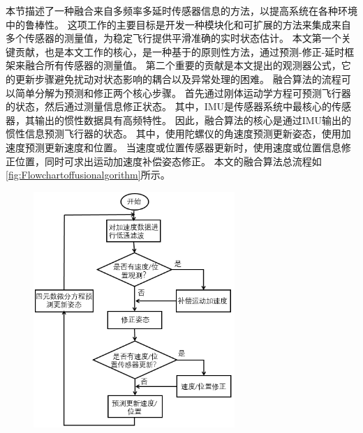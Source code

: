 \documentclass[
  type=master
]{gdutthesis}
\begin{document}
本节描述了一种融合来自多频率多延时传感器信息的方法，以提高系统在各种环境中的鲁棒性。
这项工作的主要目标是开发一种模块化和可扩展的方法来集成来自多个传感器的测量值，为稳定飞行提供平滑准确的实时状态估计。
本文第一个关键贡献，也是本文工作的核心，是一种基于\parencite{mahony2008nonlinear}的原则性方法，通过预测-修正-延时框架来融合所有传感器的测量值。
第二个重要的贡献是本文提出的观测器公式，它的更新步骤避免扰动对状态影响的耦合以及异常处理的困难。
融合算法的流程可以简单分解为预测和修正两个核心步骤。
首先通过刚体运动学方程可预测飞行器的状态，然后通过测量信息修正状态。
其中，IMU是传感器系统中最核心的传感器，其输出的惯性数据具有高频特性。
因此，融合算法的核心是通过IMU输出的惯性信息预测飞行器的状态。
其中，使用陀螺仪的角速度预测更新姿态，使用加速度预测更新速度和位置。
当速度或位置传感器更新时，使用速度或位置信息修正位置，同时可求出运动加速度补偿姿态修正。
本文的融合算法总流程如\autoref{fig:Flowchartoffusionalgorithm}所示。
\begin{figure}[H]
	\centering
	\includegraphics[width=0.68\textwidth]{屏幕截图 2022-06-08 113324.png}
	\label{fig:Flowchartoffusionalgorithm}
\end{figure}
\end{document}
